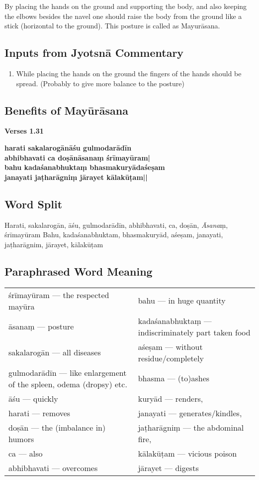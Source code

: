 By placing the hands on the ground and supporting the body, and also keeping the elbows besides the navel one should raise the body from the ground like a stick (horizontal to the ground). This posture is called as Mayurāsana.

\subsection*{Inputs from Jyotsnā Commentary}

\begin{enumerate}
\item While placing the hands on the ground the fingers of the hands should be spread. (Probably to give more balance to the posture) 
\end{enumerate}

\subsection*{Benefits of Mayūrāsana}

\noindent 
\textbf{Verses 1.31}

\begin{shloka}
\textbf{harati sakalarogānāśu gulmodarādīn}\\
\textbf{abhibhavati ca doṣānāsanaṃ śrīmayūram|}\\
\textbf{bahu kadaśanabhuktaṃ bhasmakuryādaśeṣam}\\
\textbf{janayati jaṭharāgniṃ jārayet kālakūṭam||}
\end{shloka}

\subsection*{Word Split}

Harati, sakalarogān, āśu, gulmodarādīn, abhibhavati, ca, doṣān, \textit{Āsana}ṃ, śrīmayūram
Bahu, kadaśanabhuktam, bhasmakuryād, aśeṣam, janayati, jaṭharāgnim, jārayet, kālakūṭam

\subsection*{Paraphrased Word Meaning}

\begin{longtable}{>{\noindent\raggedright}p{5cm}>{\noindent\raggedright}p{5cm}}
śrīmayūram --- the respected mayūra  & bahu --- in huge quantity\tabularnewline
āsanaṃ --- posture  & kadaśanabhuktaṃ --- indiscriminately part taken food\tabularnewline
sakalarogān --- all diseases   & aśeṣam --- without residue/completely\tabularnewline
gulmodarādīn --- like enlargement of the spleen, odema (dropsy) etc. &  bhasma --- (to)ashes  \tabularnewline
āśu --- quickly  & kuryād --- renders, \tabularnewline
harati --- removes & janayati --- generates/kindles,\tabularnewline
doṣān --- the (imbalance in) humors  & jaṭharāgniṃ --- the abdominal fire,\tabularnewline
ca --- also & kālakūṭam --- vicious poison \tabularnewline
abhibhavati --- overcomes   & jārayet --- digests
\end{longtable}

